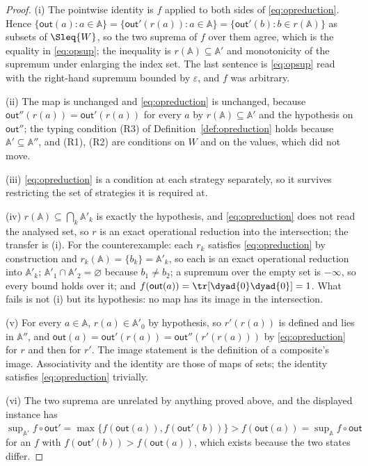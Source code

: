 \begin{proof}
(i) The pointwise identity is $f$ applied to both sides of
\eqref{eq:opreduction}. Hence
$\{\mathsf{out}(a):a\in\mathbb{A}\}
=\{\mathsf{out}'(r(a)):a\in\mathbb{A}\}
=\{\mathsf{out}'(b):b\in r(\mathbb{A})\}$
as subsets of $\Sleq{W}$, so the two suprema of $f$ over them agree, which is
the equality in \eqref{eq:opsup}; the inequality is
$r(\mathbb{A})\subseteq\mathbb{A}'$ and monotonicity of the supremum under
enlarging the index set. The last sentence is \eqref{eq:opsup} read with the
right-hand supremum bounded by $\varepsilon$, and $f$ was arbitrary.

(ii) The map is unchanged and \eqref{eq:opreduction} is unchanged, because
$\mathsf{out}''(r(a))=\mathsf{out}'(r(a))$ for every $a$ by
$r(\mathbb{A})\subseteq\mathbb{A}'$ and the hypothesis on $\mathsf{out}''$;
the typing condition (R3) of Definition~\ref{def:opreduction} holds because
$\mathbb{A}'\subseteq\mathbb{A}''$, and (R1), (R2) are conditions on $W$ and on
the values, which did not move.

(iii) \eqref{eq:opreduction} is a condition at each strategy separately, so it
survives restricting the set of strategies it is required at.

(iv) $r(\mathbb{A})\subseteq\bigcap_k\mathbb{A}'_k$ is exactly the hypothesis,
and \eqref{eq:opreduction} does not read the analysed set, so $r$ is an exact
operational reduction into the intersection; the transfer is (i). For the
counterexample: each $r_k$ satisfies \eqref{eq:opreduction} by construction and
$r_k(\mathbb{A})=\{b_k\}=\mathbb{A}'_k$, so each is an exact operational
reduction into $\mathbb{A}'_k$; $\mathbb{A}'_1\cap\mathbb{A}'_2=\varnothing$
because $b_1\ne b_2$; a supremum over the empty set is $-\infty$, so every
bound holds over it; and $f(\mathsf{out}(a))=\tr[\dyad{0}\dyad{0}]=1$. What
fails is not (i) but its hypothesis: no map has its image in the intersection.

(v) For every $a\in\mathbb{A}$, $r(a)\in\mathbb{A}'_0$ by hypothesis, so
$r'(r(a))$ is defined and lies in $\mathbb{A}''$, and
$\mathsf{out}(a)=\mathsf{out}'(r(a))=\mathsf{out}''(r'(r(a)))$ by
\eqref{eq:opreduction} for $r$ and then for $r'$. The image statement is the
definition of a composite's image. Associativity and the identity are those of
maps of sets; the identity satisfies \eqref{eq:opreduction} trivially.

(vi) The two suprema are unrelated by anything proved above, and the displayed
instance has $\sup_{\mathbb{A}'}f\circ\mathsf{out}'
=\max\{f(\mathsf{out}(a)),f(\mathsf{out}'(b))\}
>f(\mathsf{out}(a))=\sup_{\mathbb{A}}f\circ\mathsf{out}$ for an $f$ with
$f(\mathsf{out}'(b))>f(\mathsf{out}(a))$, which exists because the two states
differ.
\end{proof}
